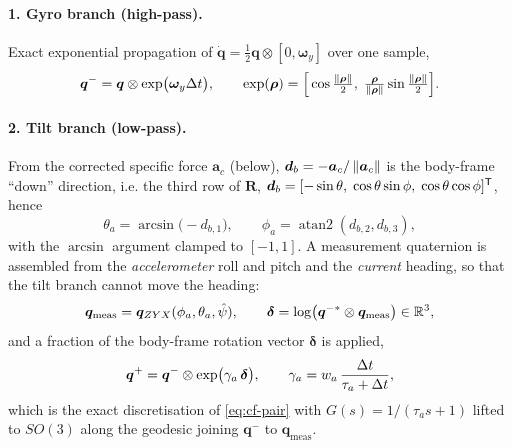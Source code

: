 \paragraph{1. Gyro branch (high-pass).} Exact exponential propagation of
$\dot{\bm{q}}=\tfrac12\bm{q}\otimes[0,\bm{\omega}_y]$ over one sample,
\begin{equation}
\bm{q}^- = \bm{q}\otimes\exp\!\big(\bm{\omega}_y\Delta t\big),\qquad
\exp(\bm{\rho}) = \Big[\cos\tfrac{\left\lVert \bm{\rho} \right\rVert}{2},\;
 \tfrac{\bm{\rho}}{\left\lVert \bm{\rho} \right\rVert}\sin\tfrac{\left\lVert \bm{\rho} \right\rVert}{2}\Big].
\label{eq:cf-prop}
\end{equation}

\paragraph{2. Tilt branch (low-pass).} From the corrected specific force $\bm{a}_c$ (below),
$\bm{d}_b = -\bm{a}_c/\left\lVert \bm{a}_c \right\rVert$ is the body-frame ``down'' direction, i.e. the third row of
$\bm{R}$, $\bm{d}_b = [-\sin\theta,\;\cos\theta\sin\phi,\;\cos\theta\cos\phi]^{\mathsf{T}}$, hence
\begin{equation}
\theta_a = \arcsin\!\big(-d_{b,1}\big),\qquad \phi_a = \operatorname{atan2}(d_{b,2},d_{b,3}),
\label{eq:cf-tilt}
\end{equation}
with the $\arcsin$ argument clamped to $[-1,1]$. A measurement quaternion is assembled from the
\emph{accelerometer} roll and pitch and the \emph{current} heading, so that the tilt branch cannot
move the heading:
\begin{equation}
\bm{q}_{\text{meas}} = \bm{q}_{ZYX}(\phi_a,\theta_a,\hat\psi),\qquad
\bm{\delta} = \log\!\big(\bm{q}^{-*}\otimes\bm{q}_{\text{meas}}\big)\in\mathbb{R}^3,
\label{eq:cf-delta}
\end{equation}
and a fraction of the body-frame rotation vector $\bm{\delta}$ is applied,
\begin{equation}
\bm{q}^+ = \bm{q}^-\otimes\exp\!\big(\gamma_a\,\bm{\delta}\big),\qquad
\gamma_a = w_a\,\frac{\Delta t}{\tau_a+\Delta t},
\label{eq:cf-tiltblend}
\end{equation}
which is the exact discretisation of \eqref{eq:cf-pair} with $G(s)=1/(\tau_a s+1)$ lifted to
$SO(3)$ along the geodesic joining $\bm{q}^-$ to $\bm{q}_{\text{meas}}$.

